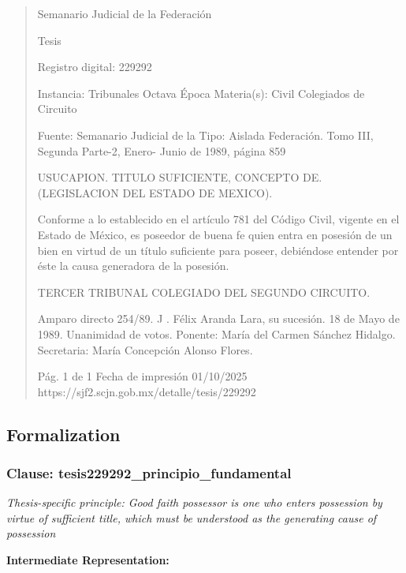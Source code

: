 \documentclass[11pt,a4paper]{article}
\begin{document}
\begin{quote}
                                                   Semanario Judicial de la Federación

                                                  Tesis

 Registro digital: 229292

 Instancia: Tribunales            Octava Época                        Materia(s): Civil
 Colegiados de Circuito

                                  Fuente: Semanario Judicial de la    Tipo: Aislada
                                  Federación.
                                  Tomo III, Segunda Parte-2, Enero-
                                  Junio de 1989, página 859


USUCAPION. TITULO SUFICIENTE, CONCEPTO DE. (LEGISLACION DEL ESTADO DE
MEXICO).


Conforme a lo establecido en el artículo 781 del Código Civil, vigente en el Estado de México, es
poseedor de buena fe quien entra en posesión de un bien en virtud de un título suficiente para
poseer, debiéndose entender por éste la causa generadora de la posesión.

TERCER TRIBUNAL COLEGIADO DEL SEGUNDO CIRCUITO.


Amparo directo 254/89. J . Félix Aranda Lara, su sucesión. 18 de Mayo de 1989. Unanimidad de
votos. Ponente: María del Carmen Sánchez Hidalgo. Secretaria: María Concepción Alonso Flores.




                                             Pág. 1 de 1          Fecha de impresión 01/10/2025
  https://sjf2.scjn.gob.mx/detalle/tesis/229292

\end{quote}

\subsection{Formalization}

\subsubsection{Clause: tesis229292\_principio\_fundamental}

\textit{Thesis-specific principle: Good faith possessor is one who enters possession by virtue of sufficient title, which must be understood as the generating cause of possession}

\textbf{Intermediate Representation:}
\end{document}
